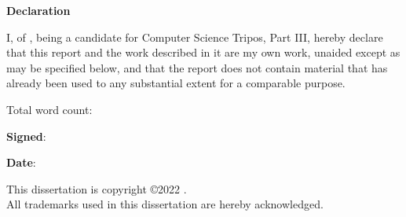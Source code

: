 \newpage
{\Huge \bf Declaration}

\vspace{24pt} 

I, \authorname of \authorcollege , being a candidate for Computer Science Tripos, Part III, hereby declare that this report and the work described in it are my own work, unaided except as may be specified below, and that the report does not contain material that has already been used to any substantial extent for a comparable purpose.

\vspace{24pt}
Total word count: \wordcount

\vspace{60pt}
\textbf{Signed}: 

\vspace{12pt}
\textbf{Date}:


\vfill

This dissertation is copyright \copyright 2022 \authorname. 
\\
All trademarks used in this dissertation are hereby acknowledged.



\newpage
\vspace*{\fill}
